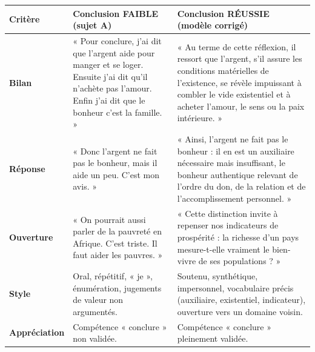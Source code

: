 \documentclass[11pt]{article}
\begin{document}
\begin{center}
\begin{tabularx}{\linewidth}{|l|X|X|}
\hline
\rowcolor{popblueL}
\textbf{Critère} & \textbf{\textcolor{poporange}{Conclusion FAIBLE (sujet A)}} & \textbf{\textcolor{popgreen}{Conclusion RÉUSSIE (modèle corrigé)}} \\
\hline
\textbf{Bilan} & « Pour conclure, j'ai dit que l'argent aide pour manger et se loger. Ensuite j'ai dit qu'il n'achète pas l'amour. Enfin j'ai dit que le bonheur c'est la famille. » & « Au terme de cette réflexion, il ressort que l'argent, s'il assure les conditions matérielles de l'existence, se révèle impuissant à combler le vide existentiel et à acheter l'amour, le sens ou la paix intérieure. » \\
\hline
\textbf{Réponse} & « Donc l'argent ne fait pas le bonheur, mais il aide un peu. C'est mon avis. » & « Ainsi, l'argent ne fait pas le bonheur : il en est un auxiliaire nécessaire mais insuffisant, le bonheur authentique relevant de l'ordre du don, de la relation et de l'accomplissement personnel. » \\
\hline
\textbf{Ouverture} & « On pourrait aussi parler de la pauvreté en Afrique. C'est triste. Il faut aider les pauvres. » & « Cette distinction invite à repenser nos indicateurs de prospérité : la richesse d'un pays mesure-t-elle vraiment le bien-vivre de ses populations ? » \\
\hline
\textbf{Style} & Oral, répétitif, « je », énumération, jugements de valeur non argumentés. & Soutenu, synthétique, impersonnel, vocabulaire précis (auxiliaire, existentiel, indicateur), ouverture vers un domaine voisin. \\
\hline
\textbf{Appréciation} & Compétence « conclure » non validée. & Compétence « conclure » pleinement validée. \\
\hline
\end{tabularx}
\end{center}
\end{document}
